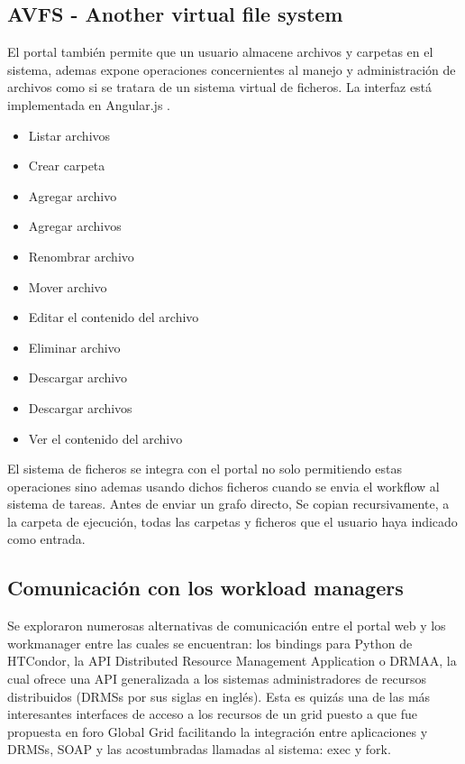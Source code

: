 \subsection{AVFS - Another virtual file system}
El portal también permite que un usuario almacene archivos y carpetas en el sistema, ademas expone operaciones concernientes al manejo y administración de archivos como si se tratara de un sistema virtual de ficheros. La interfaz está implementada en Angular.js \cite{filemanager}.

\begin{itemize}
\item Listar archivos
\item Crear carpeta
\item Agregar archivo
\item Agregar archivos
\item Renombrar archivo
\item Mover archivo
\item Editar el contenido del archivo
\item Eliminar archivo
\item Descargar archivo
\item Descargar archivos
\item Ver el contenido del archivo
\end{itemize}

El sistema de ficheros se integra con el portal no solo permitiendo estas operaciones sino ademas usando dichos ficheros cuando se envia el workflow al sistema de tareas. Antes de enviar un grafo directo, Se copian recursivamente, a la carpeta de ejecución, todas las carpetas y ficheros que el usuario haya indicado como entrada.

\subsection{Comunicación con los workload managers}
Se exploraron numerosas alternativas de comunicación entre el portal web y los workmanager entre las cuales se encuentran: los bindings para Python de HTCondor, la API Distributed Resource Management Application o DRMAA, la cual ofrece una API generalizada a los sistemas administradores de recursos distribuidos (DRMSs por sus siglas en inglés). Esta es quizás una de las más interesantes interfaces de acceso a los recursos de un grid puesto a que fue propuesta en foro Global Grid facilitando la integración entre aplicaciones y DRMSs, SOAP y las acostumbradas llamadas al sistema: exec y fork.

